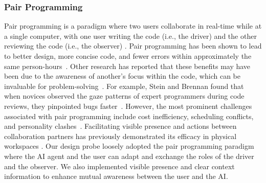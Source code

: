 \subsubsection{Pair Programming}
Pair programming is a paradigm where two users collaborate in real-time while at a single computer, with one user writing the code (i.e., the driver) and the other reviewing the code (i.e., the observer) \cite{cockburn2000costs}. 
Pair programming has been shown to lead to better design, more concise code, and fewer errors within approximately the same person-hours~\cite{williams2003pair, Begel_pair}.
Other research has reported that these benefits may have been due to the awareness of another's focus within the code, which can be invaluable for problem-solving~\cite{lee2017exploring}.
For example, Stein and Brennan found that when novices observed the gaze patterns of expert programmers during code reviews, they pinpointed bugs faster~\cite{stein2004another}.
However, the most prominent challenges associated with pair programming include cost inefficiency, scheduling conflicts, and personality clashes~\cite{Begel_pair}.
Facilitating visible presence and actions between collaboration partners has previously demonstrated its efficacy in physical workspaces \cite{dourish1992awarness_workspace}.
Our design probe loosely adopted the pair programming paradigm where the AI agent and the user can adapt and exchange the roles of the driver and the observer.
We also implemented visible presence and clear context information to enhance mutual awareness between the user and the AI.


